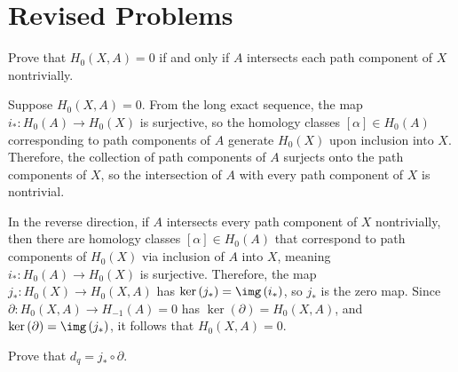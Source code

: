 \documentclass[10pt]{mypackage}
\begin{document}
\RaggedRight
\section{Revised Problems}%
\begin{problem}
  Prove that $H_0\left( X,A \right) = 0$ if and only if $A$ intersects each path component of $X$ nontrivially.
\end{problem}
\begin{solution}
  Suppose $H_0\left( X,A \right) = 0$. From the long exact sequence, the map $i_{\ast}\colon H_0\left( A \right)\rightarrow H_0\left( X \right)$ is surjective, so the homology classes $\left[ \alpha \right]\in H_0\left( A \right)$ corresponding to path components of $A$ generate $H_0\left( X \right)$ upon inclusion into $X$. Therefore, the collection of path components of $A$ surjects onto the path components of $X$, so the intersection of $A$ with every path component of $X$ is nontrivial.

  In the reverse direction, if $A$ intersects every path component of $X$ nontrivially, then there are homology classes $\left[ \alpha \right]\in H_0\left( A \right)$ that correspond to path components of $H_0\left( X \right)$ via inclusion of $A$ into $X$, meaning $i_{\ast}\colon H_0\left( A \right)\rightarrow H_0\left( X \right)$ is surjective. Therefore, the map $j_{\ast}\colon H_0\left( X \right)\rightarrow H_0\left( X,A \right)$ has $\ker\left( j_{\ast} \right) = \img\left( i_{\ast} \right)$, so $j_{\ast}$ is the zero map. Since $\partial\colon H_0\left( X,A \right)\rightarrow H_{-1}\left( A \right) = 0$ has $\ker\left( \partial \right) = H_{0}\left( X,A \right)$, and $\ker\left( \partial \right) = \img\left( j_{\ast} \right)$, it follows that $H_0\left( X,A \right) = 0$.
\end{solution}
\begin{problem}
  Prove that $d_q = j_{\ast}\circ \partial$.
\end{problem}
\end{document}
